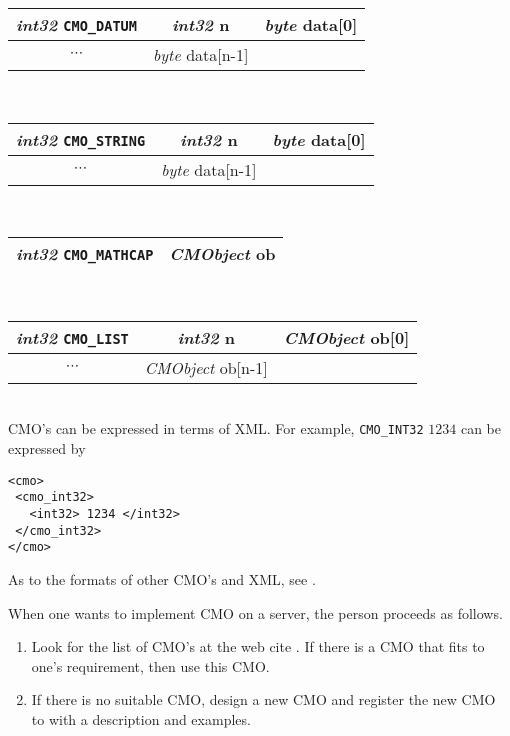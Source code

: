 \begin{tabular}{|c|c|c|}
\hline
{\sl int32} {\tt CMO\_DATUM}& {\sl int32} {\rm n} & {\sl byte} {\rm  data[0]} \\
\hline
$\cdots$ & {\sl byte} {\rm  data[n-1]} \\ 
\cline{1-2}
\end{tabular} \\
\begin{tabular}{|c|c|c|}
\hline
{\sl int32} {\tt CMO\_STRING}& {\sl int32} {\rm n} & {\sl byte} {\rm data[0]} \\
\hline
$\cdots$ & {\sl byte} {\rm data[n-1]} \\ 
\cline{1-2}
\end{tabular} \\
\begin{tabular}{|c|c|}
\hline
{\sl int32} {\tt CMO\_MATHCAP} & {\sl CMObject} {\rm ob} \\ 
\hline
\end{tabular} \\
\begin{tabular}{|c|c|c|}
\hline
{\sl int32} {\tt CMO\_LIST}& {\sl int32} {\rm n} & {\sl CMObject} {\rm ob[0]} \\
\hline
$\cdots$ & {\sl CMObject} {\rm ob[n-1]} \\ 
\cline{1-2}
\end{tabular} \\
CMO's can be expressed in terms of XML.
For example, {\tt CMO\_INT32} $1234$ can be expressed by
{\footnotesize
\begin{verbatim}
<cmo>
 <cmo_int32>
   <int32> 1234 </int32>
 </cmo_int32>
</cmo>
\end{verbatim}
}
As to the formats of other CMO's and XML, see \cite{ox-rfc-100}.

When one wants to implement CMO on a server, the person proceeds 
as follows.
\begin{enumerate}
\item Look for the list of CMO's at the web cite \cite{openxm-web}.
If there is a CMO that fits to one's requirement, then use this CMO.     
\item If there is no suitable CMO, design a new CMO and register 
the new CMO to \cite{openxm-web} with a description and examples.
\end{enumerate}
